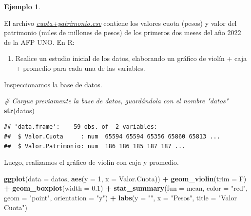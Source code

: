 \documentclass[
  11pt,
]{book}
\newenvironment{Shaded}{\begin{snugshade}}{\end{snugshade}}
\newcommand{\AttributeTok}[1]{\textcolor[rgb]{0.13,0.29,0.53}{#1}}
\newcommand{\CommentTok}[1]{\textcolor[rgb]{0.56,0.35,0.01}{\textit{#1}}}
\newcommand{\DecValTok}[1]{\textcolor[rgb]{0.00,0.00,0.81}{#1}}
\newcommand{\FloatTok}[1]{\textcolor[rgb]{0.00,0.00,0.81}{#1}}
\newcommand{\FunctionTok}[1]{\textcolor[rgb]{0.13,0.29,0.53}{\textbf{#1}}}
\newcommand{\NormalTok}[1]{#1}
\newcommand{\SpecialCharTok}[1]{\textcolor[rgb]{0.81,0.36,0.00}{\textbf{#1}}}
\newcommand{\StringTok}[1]{\textcolor[rgb]{0.31,0.60,0.02}{#1}}
\providecommand{\tightlist}{%
  \setlength{\itemsep}{0pt}\setlength{\parskip}{0pt}}
\theoremstyle{definition}
\theoremstyle{definition}
\newtheorem{example}{Ejemplo}[chapter]
\theoremstyle{definition}
\theoremstyle{definition}
\theoremstyle{remark}
\begin{document}
\begin{example}
\protect\hypertarget{exm:AFPUNO}{}\label{exm:AFPUNO}

El archivo \href{https://raw.githubusercontent.com/Dfranzani/Bases-de-datos-para-cursos/main/2022-2/Estad\%C3\%ADstica\%202/cuota\%2Bpatrimonio.csv}{\emph{cuota+patrimonio.csv}} contiene los valores cuota (pesos) y valor del patrimonio (miles de millones de pesos) de los primeros dos meses del año 2022 de la AFP UNO. En R:

\begin{enumerate}
\def\labelenumi{\arabic{enumi}.}
\tightlist
\item
  Realice un estudio inicial de los datos, elaborando un gráfico de violín + caja + promedio para cada una de las variables.
\end{enumerate}

Inspeccionamos la base de datos.

\begin{Shaded}
\begin{Highlighting}[]
\CommentTok{\# Cargue previamente la base de datos, guardándola con el nombre "datos"}
\FunctionTok{str}\NormalTok{(datos)}
\end{Highlighting}
\end{Shaded}

\begin{verbatim}
## 'data.frame':    59 obs. of  2 variables:
##  $ Valor.Cuota     : num  65594 65594 65356 65860 65813 ...
##  $ Valor.Patrimonio: num  186 186 185 187 187 ...
\end{verbatim}

Luego, realizamos el gráfico de violín con caja y promedio.

\begin{Shaded}
\begin{Highlighting}[]
\FunctionTok{ggplot}\NormalTok{(}\AttributeTok{data =}\NormalTok{ datos, }\FunctionTok{aes}\NormalTok{(}\AttributeTok{y =} \DecValTok{1}\NormalTok{, }\AttributeTok{x =}\NormalTok{ Valor.Cuota)) }\SpecialCharTok{+} 
  \FunctionTok{geom\_violin}\NormalTok{(}\AttributeTok{trim =}\NormalTok{ F) }\SpecialCharTok{+}
  \FunctionTok{geom\_boxplot}\NormalTok{(}\AttributeTok{width =} \FloatTok{0.1}\NormalTok{) }\SpecialCharTok{+}
\FunctionTok{stat\_summary}\NormalTok{(}\AttributeTok{fun =}\NormalTok{ mean, }\AttributeTok{color =} \StringTok{"red"}\NormalTok{, }\AttributeTok{geom =} \StringTok{"point"}\NormalTok{, }\AttributeTok{orientation =} \StringTok{"y"}\NormalTok{) }\SpecialCharTok{+}
  \FunctionTok{labs}\NormalTok{(}\AttributeTok{y =} \StringTok{""}\NormalTok{, }\AttributeTok{x =} \StringTok{"Pesos"}\NormalTok{, }\AttributeTok{title =} \StringTok{"Valor Cuota"}\NormalTok{)}
\end{Highlighting}
\end{Shaded}


\end{example}
\end{document}
